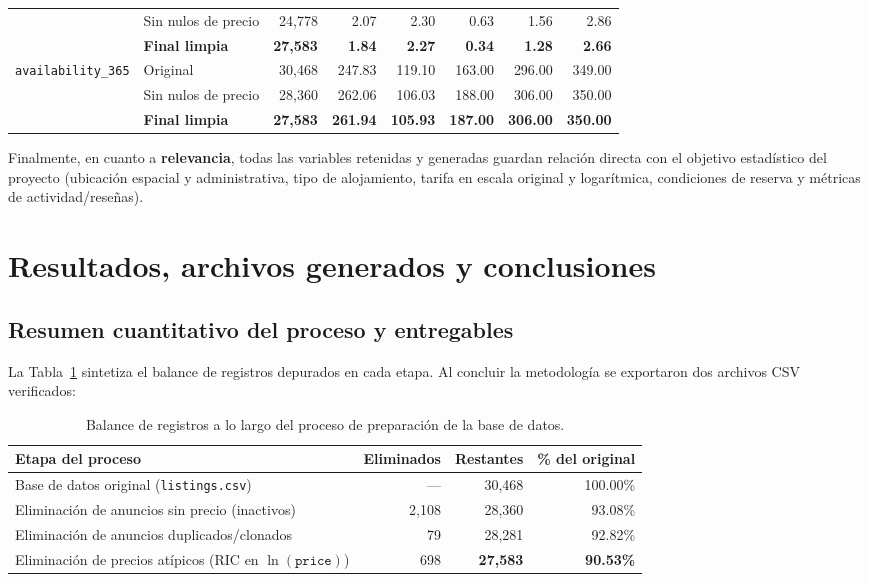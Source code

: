 \documentclass[12pt,letterpaper,oneside]{report}
\begin{document}
\begin{table}[htbp]
\begin{tabular}{l l r r r r r r}
  & Sin nulos de precio & 24,778 & 2.07 & 2.30 & 0.63 & 1.56 & 2.86 \\
  & \textbf{Final limpia} & \textbf{27,583} & \textbf{1.84} & \textbf{2.27} & \textbf{0.34} & \textbf{1.28} & \textbf{2.66} \\
\midrule
\multirow{3}{*}{\texttt{availability\_365}}
  & Original            & 30,468 & 247.83 & 119.10 & 163.00 & 296.00 & 349.00 \\
  & Sin nulos de precio & 28,360 & 262.06 & 106.03 & 188.00 & 306.00 & 350.00 \\
  & \textbf{Final limpia} & \textbf{27,583} & \textbf{261.94} & \textbf{105.93} & \textbf{187.00} & \textbf{306.00} & \textbf{350.00} \\
\bottomrule
\end{tabular}
\end{table}

Finalmente, en cuanto a \textbf{relevancia}, todas las variables retenidas y generadas guardan relación directa con el objetivo estadístico del proyecto (ubicación espacial y administrativa, tipo de alojamiento, tarifa en escala original y logarítmica, condiciones de reserva y métricas de actividad/reseñas).

\section{Resultados, archivos generados y conclusiones}
\label{sec:conclusiones}

\subsection{Resumen cuantitativo del proceso y entregables}

La Tabla~\ref{tab:embudo_resultados} sintetiza el balance de registros depurados en cada etapa. Al concluir la metodología se exportaron dos archivos CSV verificados:

\begin{table}[htbp]
\centering
\caption{Balance de registros a lo largo del proceso de preparación de la base de datos.}
\label{tab:embudo_resultados}
\footnotesize
\renewcommand{\arraystretch}{1.15}
\begin{tabular}{l r r r}
\toprule
\rowcolor{TableHeader}
\textbf{Etapa del proceso} & \textbf{Eliminados} & \textbf{Restantes} & \textbf{\% del original} \\
\midrule
Base de datos original (\texttt{listings.csv}) & --- & 30,468 & 100.00\% \\
Eliminación de anuncios sin precio (inactivos) & 2,108 & 28,360 &  93.08\% \\
Eliminación de anuncios duplicados/clonados    &    79 & 28,281 &  92.82\% \\
Eliminación de precios atípicos (RIC en $\ln(\texttt{price})$) & 698 & \textbf{27,583} & \textbf{90.53\%} \\
\bottomrule
\end{tabular}
\end{table}
\end{document}
